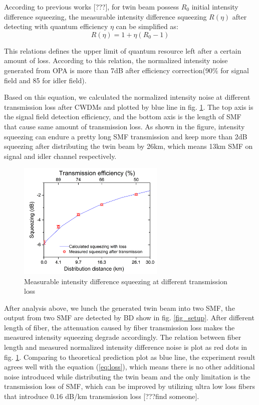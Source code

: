 \documentclass[9pt,twocolumn,twoside]{osajnl}
\begin{document}
According to previous works [???], for twin beam possess $R_0$ initial intensity difference squeezing, the measurable intensity difference squeezing $ R(\eta)$ after detecting with quantum efficiency $\eta$ can be simplified as:
\begin{equation}
R(\eta) = 1+\eta(R_0-1)
\label{eq:loss}
\end{equation}

This relations defines the upper limit of quantum resource left after a certain amount of loss. According to this relation, the normalized intensity noise generated from OPA is more than 7dB after efficiency correction(90\% for signal field and 85 for idler field).	



Based on this equation, we calculated the normalized intensity noise at different transmission loss after CWDMs and plotted by blue line in fig. \ref{fig_loss}. The top axis is the signal field detection efficiency, and the bottom axis is the length of SMF that cause same amount of transmission loss. As shown in the figure, intensity squeezing can endure a pretty long SMF transmission and keep more than 2dB squeezing after distributing the twin beam by 26km, which means 13km SMF on signal and idler channel respectively.

\begin{figure}[htbp]
\centering
\includegraphics[width=7cm]{Sqz_vs_Length_dB_color.jpg}
\caption{Measurable intensity difference squeezing at different transmission loss}
\label{fig_loss}
\end{figure}

After analysis above, we lunch the generated twin beam into two SMF, the output from two SMF are detected by BD show in fig. \ref{fig_setup}.
After different length of fiber, the attenuation caused by fiber transmission loss makes the measured intensity squeezing degrade accordingly.
The relation between fiber length and measured normalized intensity difference noise is plot as red dots in fig. \ref{fig_loss}.
Comparing to theoretical prediction plot as blue line, the experiment result agrees well with the equation (\ref{eq:loss}), which means there is no other additional noise introduced while distributing the twin beam and the only limitation is the transmission loss of SMF, which can be improved by utilizing ultra low loss fibers that introduce 0.16 dB/km transmission loss [???find someone].
\end{document}
